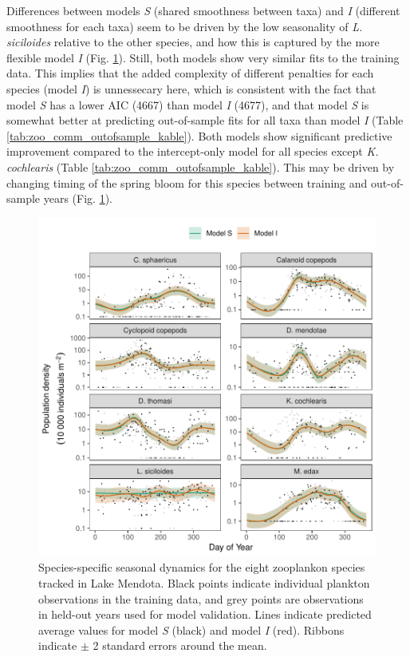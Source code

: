 \documentclass[12pt]{article}
\begin{document}
Differences between models \emph{S} (shared smoothness between taxa) and
\emph{I} (different smoothness for each taxa) seem to be driven by the
low seasonality of \emph{L. siciloides} relative to the other species,
and how this is captured by the more flexible model \emph{I} (Fig.
\ref{fig:zoo_comp}). Still, both models show very similar fits to the
training data. This implies that the added complexity of different
penalties for each species (model \emph{I}) is unnessecary here, which
is consistent with the fact that model \emph{S} has a lower AIC (4667)
than model \emph{I} (4677), and that model \emph{S} is somewhat better
at predicting out-of-sample fits for all taxa than model \emph{I} (Table
\ref{tab:zoo_comm_outofsample_kable}). Both models show significant
predictive improvement compared to the intercept-only model for all
species except \emph{K. cochlearis} (Table
\ref{tab:zoo_comm_outofsample_kable}). This may be driven by changing
timing of the spring bloom for this species between training and
out-of-sample years (Fig. \ref{fig:zoo_comp}).

\begin{figure}
\centering
\includegraphics{../figures/zoo_comm_plot-1.pdf}
\caption{\label{fig:zoo_comp}Species-specific seasonal dynamics for the
eight zooplankon species tracked in Lake Mendota. Black points indicate
individual plankton observations in the training data, and grey points
are observations in held-out years used for model validation. Lines
indicate predicted average values for model \emph{S} (black) and model
\emph{I} (red). Ribbons indicate \(\pm\) 2 standard errors around the
mean.}
\end{figure}
\end{document}
